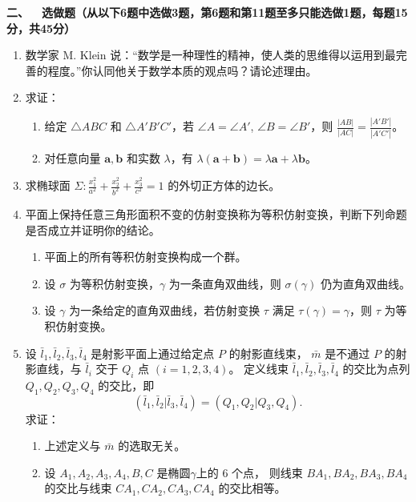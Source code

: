 \textbf{二、\ \ 选做题（从以下6题中选做3题，第6题和第11题至多只能选做1题，每题15分，共45分）}

\begin{enumerate}
    
    \item 数学家 M. Klein 说：“数学是一种理性的精神，使人类的思维得以运用到最完善的程度。”你认同他关于数学本质的观点吗？请论述理由。

    \item 求证：
    \begin{enumerate}
        \item[(a)] 给定 $\triangle ABC$ 和 $\triangle A'B'C'$，若 $\angle A = \angle A'$, $\angle B = \angle B'$，则 $\frac{|AB|}{|AC|} = \frac{|A'B'|}{|A'C'|}$。
        \item[(b)] 对任意向量 $\mathbf{a}, \mathbf{b}$ 和实数 $\lambda$，有 $\lambda(\mathbf{a}+\mathbf{b}) = \lambda \mathbf{a} + \lambda \mathbf{b}$。
    \end{enumerate}

    \item 求椭球面 $\Sigma: \frac{x_1^2}{a^2} + \frac{x_2^2}{b^2} + \frac{x_3^2}{c^2} = 1$ 的外切正方体的边长。

    \item 平面上保持任意三角形面积不变的仿射变换称为等积仿射变换，判断下列命题是否成立并证明你的结论。
    \begin{enumerate}
        \item[(a)] 平面上的所有等积仿射变换构成一个群。
        \item[(b)] 设 $\sigma$ 为等积仿射变换，$\gamma$ 为一条直角双曲线，则 $\sigma(\gamma)$ 仍为直角双曲线。
        \item[(c)] 设 $\gamma$ 为一条给定的直角双曲线，若仿射变换 $\tau$ 满足 $\tau(\gamma)=\gamma$，则 $\tau$ 为等积仿射变换。
    \end{enumerate}

    \item 设 $\bar{l}_1, \bar{l}_2, \bar{l}_3, \bar{l}_4$ 是射影平面上通过给定点 $P$ 的射影直线束，
    $\bar{m}$ 是不通过 $P$ 的射影直线，与 $\bar{l}_i$ 交于 $Q_i$ 点 $(i=1,2,3,4)$。
    定义线束 $\bar{l}_1, \bar{l}_2, \bar{l}_3, \bar{l}_4$ 的交比为点列 $Q_1, Q_2, Q_3, Q_4$ 的交比，即
    \[ (\bar{l}_1, \bar{l}_2 | \bar{l}_3, \bar{l}_4) = (Q_1, Q_2 | Q_3, Q_4). \]
    求证：
    \begin{enumerate}
        \item[(a)] 上述定义与 $\bar{m}$ 的选取无关。
        \item[(b)] 设 $A_1, A_2, A_3, A_4, B, C$ 是椭圆$\gamma$上的 $6$ 个点，
        则线束 $BA_1, BA_2, BA_3, BA_4$ 的交比与线束 $CA_1, CA_2, CA_3, CA_4$ 的交比相等。
    \end{enumerate}


\end{enumerate}
